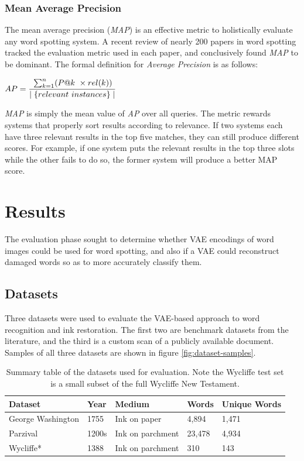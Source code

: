 \documentclass[final]{ukthesis}
\begin{document}
\subsection{Mean Average Precision}
The mean average precision ({\em MAP}) is an effective metric to holistically evaluate any word spotting system. A recent review \cite{giotis2017survey} of nearly 200 papers in word spotting tracked the evaluation metric used in each paper, and conclusively found {\em MAP} to be dominant. The formal definition for {\em Average Precision} is as follows:

\begin{center}
\begin{math}
{AP}=\cfrac{\sum_{k=1}^n (P@k\ \times rel(k))}{\mid\{relevant \ instances\}\mid}
\end{math}
\end{center}

{\em MAP} is simply the mean value of {\em AP} over all queries. The metric rewards systems that properly sort results according to relevance. If two systems each have three relevant results in the top five matches, they can still produce different scores. For example, if one system puts the relevant results in the top three slots while the other fails to do so, the former system will produce a better MAP score.


%
%
%
\chapter{Results}
The evaluation phase sought to determine whether VAE encodings of word images could be used for word spotting, and also if a VAE could reconstruct damaged words so as to more accurately classify them.

%
%
\section{Datasets}
Three datasets were used to evaluate the VAE-based approach to word recognition and ink restoration. The first two are benchmark datasets from the literature, and the third is a custom scan of a publicly available document. Samples of all three datasets are shown in figure \ref{fig:dataset-samples}.

\begin{table}[h]
\centering
\begin{tabular}{lllll}
\textbf{Dataset}  & \textbf{Year} & \textbf{Medium}  & \textbf{Words} & \textbf{Unique Words} \\
\hline
George Washington & 1755                  & Ink on paper     & 4,894          & 1,471                 \\
Parzival          & 1200s                 & Ink on parchment & 23,478         & 4,934                 \\
Wycliffe*         & 1388                  & Ink on parchment & 310            & 143                  
\end{tabular}
\caption{Summary table of the datasets used for evaluation. Note the Wycliffe test set is a small subset of the full Wycliffe New Testament.}
\label{table:datasets}
\end{table}
\end{document}
